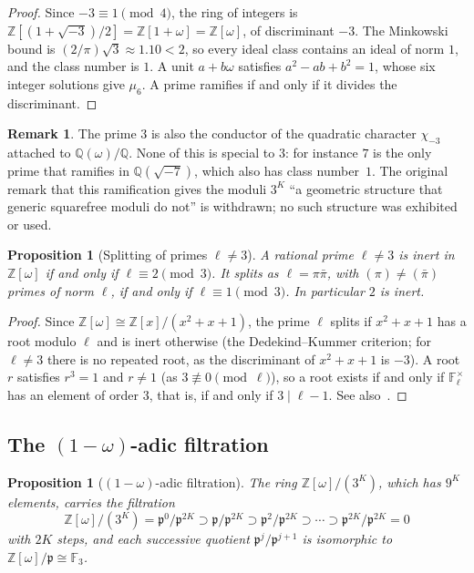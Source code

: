\documentclass[12pt]{amsart}
\theoremstyle{plain}
\newtheorem{proposition}[theorem]{Proposition}
\theoremstyle{definition}
\newtheorem{remark}[theorem]{Remark}
\newcommand{\Z}{\mathbb{Z}}
\newcommand{\Q}{\mathbb{Q}}
\newcommand{\F}{\mathbb{F}}
\newcommand{\Zomega}{\Z[\omega]}
\newcommand{\Qomega}{\Q(\omega)}
\newcommand{\pp}{\mathfrak{p}}
\begin{document}
\begin{proof}
Since $-3 \equiv 1 \pmod 4$, the ring of integers is
$\Z[(1+\sqrt{-3})/2] = \Z[1+\omega] = \Zomega$, of discriminant $-3$. The
Minkowski bound is $(2/\pi)\sqrt{3} \approx 1.10 < 2$, so every ideal class
contains an ideal of norm $1$, and the class number is $1$. A unit
$a + b\omega$ satisfies $a^2 - ab + b^2 = 1$, whose six integer solutions give
$\mu_6$. A prime ramifies if and only if it divides the discriminant.
\end{proof}

\begin{remark}
The prime $3$ is also the conductor of the quadratic character $\chi_{-3}$
attached to $\Qomega/\Q$. None of this is special to $3$: for instance $7$ is
the only prime that ramifies in $\Q(\sqrt{-7})$, which also has class
number~$1$. The original remark that this ramification gives the moduli $3^K$
``a geometric structure that generic squarefree moduli do not'' is withdrawn;
no such structure was exhibited or used.
\end{remark}

\begin{proposition}[Splitting of primes $\ell \neq 3$]
\label{prop:inertsplit}
A rational prime $\ell \neq 3$ is inert in $\Zomega$ if and only if
$\ell \equiv 2 \pmod{3}$. It splits as $\ell = \pi\bar\pi$, with $(\pi) \neq
(\bar\pi)$ primes of norm $\ell$, if and only if $\ell \equiv 1 \pmod{3}$.
In particular $2$ is inert.
\end{proposition}

\begin{proof}
Since $\Zomega \cong \Z[x]/(x^2+x+1)$, the prime $\ell$ splits if
$x^2 + x + 1$ has a root modulo $\ell$ and is inert otherwise (the
Dedekind--Kummer criterion; for $\ell \neq 3$ there is no repeated root, as
the discriminant of $x^2+x+1$ is $-3$). A root $r$ satisfies $r^3 = 1$ and
$r \neq 1$ (as $3 \not\equiv 0 \pmod \ell$), so a root exists if and only if
$\F_\ell^\times$ has an element of order $3$, that is, if and only if
$3 \mid \ell - 1$. See also~\cite{Cox1989}.
\end{proof}

\subsection{The $(1-\omega)$-adic filtration}

\begin{proposition}[$(1-\omega)$-adic filtration]
\label{prop:filtration}
The ring $\Zomega/(3^K)$, which has $9^K$ elements, carries the filtration
\[
  \Zomega/(3^K) = \pp^0/\pp^{2K} \supset \pp/\pp^{2K} \supset \pp^2/\pp^{2K}
  \supset \cdots \supset \pp^{2K}/\pp^{2K} = 0
\]
with $2K$ steps, and each successive quotient $\pp^j/\pp^{j+1}$ is
isomorphic to $\Zomega/\pp \cong \F_3$.
\end{proposition}
\end{document}
